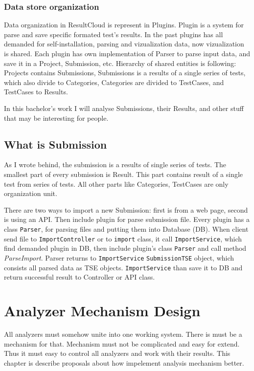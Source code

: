 \subsection{Data store organization}

Data organization in ResultCloud is represent in Plugins. Plugin is a system for parse and save specific formated test's results. In the past plugins has all demanded for self-installation, parsing and vizualization data, now vizualization is shared. 
Each plugin has own implementation of Parser to parse input data, and save it in a Project, Submission, etc. Hierarchy of shared entities is following: Projects  contains Submissions, Submissions is a results of a single series of tests, which also divide to Categories, Categories are divided to TestCases, and TestCases to Results.

In this bachelor's work I will analyse Submissions, their Results, and other stuff that may be interesting for people.

\section{What is Submission}

As I wrote behind, the submission is a results of single series of tests. The smallest part of every submission is Result. This part contains result of a single test from series of tests. All other parts like Categories, TestCases are only organization unit. 

There are two ways to import a new Submission: first is from a web page, second is using an API. Then include plugin for parse submission file. Every plugin has a class \texttt{Parser}, for parsing files and putting them into Database (DB). When client send file to \texttt{ImportController} or to \texttt{import} class, it call \texttt{ImportService}, which find demanded plugin in DB, then include plugin's class \texttt{Parser} and call method \emph{ParseImport}. Parser returns to \texttt{ImportService} \texttt{SubmissionTSE} object, which consists all parsed data as TSE objects. \texttt{ImportService} than save it to DB and return successful result to Controller or API class.

\chapter{Analyzer Mechanism Design}
\label{ch:analyzer_proposal}

All analyzers must somehow unite into one working system. There is must be a mechanism for that. Mechanism must not be complicated and easy for extend. Thus it must easy to control all analyzers and work with their results. This chapter is describe proposals about how impelement analysis mechanism better.

